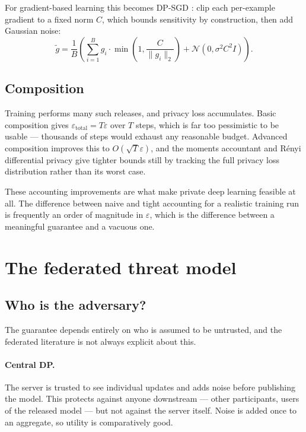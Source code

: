 \documentclass[11pt,a4paper]{article}
\begin{document}
For gradient-based learning this becomes DP-SGD \cite{abadi2016}: clip each
per-example gradient to a fixed norm $C$, which bounds sensitivity by
construction, then add Gaussian noise:
\begin{equation}
  \tilde{g} = \frac{1}{B}\left(
    \sum_{i=1}^{B} g_i \cdot \min\!\left(1, \frac{C}{\|g_i\|_2}\right)
    + \mathcal{N}(0, \sigma^2 C^2 I) \right).
  \label{eq:dpsgd}
\end{equation}

\subsection{Composition}

Training performs many such releases, and privacy loss accumulates. Basic
composition gives $\varepsilon_{\text{total}} = T\varepsilon$ over $T$ steps,
which is far too pessimistic to be usable --- thousands of steps would exhaust
any reasonable budget. Advanced composition improves this to
$O(\sqrt{T} \varepsilon)$, and the moments accountant \cite{abadi2016} and
Rényi differential privacy \cite{mironov2017} give tighter bounds still by
tracking the full privacy loss distribution rather than its worst case.

These accounting improvements are what make private deep learning feasible at
all. The difference between naive and tight accounting for a realistic
training run is frequently an order of magnitude in $\varepsilon$, which is
the difference between a meaningful guarantee and a vacuous one.

\section{The federated threat model}
\label{sec:threat}

\subsection{Who is the adversary?}

The guarantee depends entirely on who is assumed to be untrusted, and the
federated literature is not always explicit about this.

\paragraph{Central DP.}
The server is trusted to see individual updates and adds noise before
publishing the model. This protects against anyone downstream --- other
participants, users of the released model --- but not against the server
itself. Noise is added once to an aggregate, so utility is comparatively good.
\end{document}
